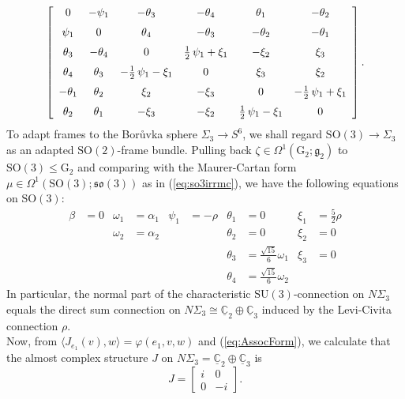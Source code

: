 \documentclass[11pt]{article}
\newcommand{\SO}{\mathrm{SO}}
\newcommand{\SU}{\mathrm{SU}}
\newcommand{\G}{\mathrm{G}}
\newcommand{\C}{\mathbb{C}}
\newcommand{\uC}{\underline{\mathbb{C}}}
\theoremstyle{definition}
\numberwithin{equation}{section}
\begin{document}
\begin{equation} \label{eq:CharConn}
    \left[ \begin {array}{cccccc} 0&-\psi_{{1}}&-\theta_{{3}}&-\theta_{{4
}}&\theta_{{1}}&-\theta_{{2}}\\ \noalign{\medskip}\psi_{{1}}&0&\theta_
{{4}}&-\theta_{{3}}&-\theta_{{2}}&-\theta_{{1}}\\ \noalign{\medskip}
\theta_{{3}}&-\theta_{{4}}&0&\tfrac{1}{2}\,\psi_{{1}}+\xi_{{1}}&-\xi_{{2}}&\xi_
{{3}}\\ \noalign{\medskip}\theta_{{4}}&\theta_{{3}}&-\tfrac{1}{2}\,\psi_{{1}}-
\xi_{{1}}&0&\xi_{{3}}&\xi_{{2}}\\ \noalign{\medskip}-\theta_{{1}}&
\theta_{{2}}&\xi_{{2}}&-\xi_{{3}}&0&-\tfrac{1}{2}\,\psi_{{1}}+\xi_{{1}}
\\ \noalign{\medskip}\theta_{{2}}&\theta_{{1}}&-\xi_{{3}}&-\xi_{{2}} & \frac{1}{2}\,\psi_{{1}}-\xi_{{1}} & 0\end {array} \right].
\end{equation}
To adapt frames to the Bor{\r{u}}vka sphere $\Sigma_3 \to S^6$, we shall regard $\SO(3) \to \Sigma_3$ as an adapted $\SO(2)$-frame bundle.  Pulling back $\zeta \in \Omega^1(\G_2; \mathfrak{g}_2)$ to $\SO(3) \leq \G_2$ and comparing with the Maurer-Cartan form $\mu \in \Omega^1(\SO(3); \mathfrak{so}(3))$ as in (\ref{eq:so3irrmc}), we have the following equations on $\SO(3)$:
\begin{align*}
\beta & = 0 & \omega_1 & = \alpha_1 & \psi_1 & = -\rho & \theta_1 & = 0 & \xi_1 & = \tfrac{5}{2}\rho \\
& & \omega_2 & = \alpha_2 &  & & \theta_2 & = 0 & \xi_2 & = 0 \\
  & &  &  &  & & \theta_3 & = \tfrac{\sqrt{15}}{6} \omega_1 & \xi_3 & = 0 \\
  &  &  & &  & & \theta_4 & = \tfrac{\sqrt{15}}{6} \omega_2
    \end{align*}
In particular, the normal part of the characteristic $\SU(3)$-connection on $N\Sigma_3$ equals the direct sum connection on $N\Sigma_3 \cong \underline{\C}_2 \oplus \underline{\C}_3$ induced by the Levi-Civita connection $\rho$.  \\
\indent Now, from $\langle J_{e_1}(v), w \rangle = \varphi(e_1, v, w)$ and (\ref{eq:AssocForm}), we calculate that the almost complex structure $J$ on $N\Sigma_3 = \uC_2 \oplus \uC_3$ is
\begin{equation*}
    J = \begin{bmatrix}
        i & 0 \\
        0 & -i
    \end{bmatrix}\!.
\end{equation*}
\end{document}
